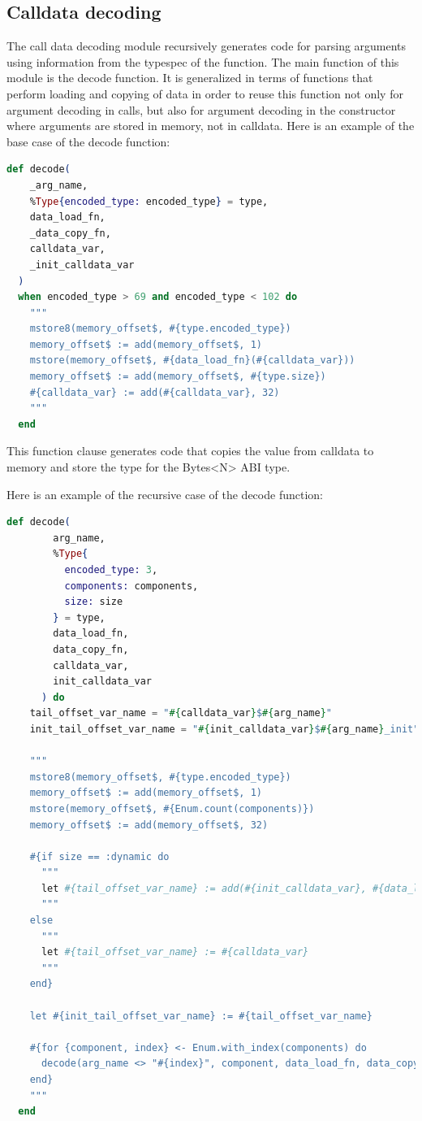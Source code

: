 \subsection{Calldata decoding}
\label{ssec:calldata_decoding}
The call data decoding module recursively generates code for parsing arguments using information from the typespec of the function. The main function of this module is the decode function. It is generalized in terms of functions that perform loading and copying of data in order to reuse this function not only for argument decoding in calls, but also for argument decoding in the constructor where arguments are stored in memory, not in calldata. Here is an example of the base case of the decode function:

\begin{lstlisting}[caption={Calldata decoding base case}, language=elixir, label={lst:calldata_decoding_base}]
  def decode(
    _arg_name,
    %Type{encoded_type: encoded_type} = type,
    data_load_fn,
    _data_copy_fn,
    calldata_var,
    _init_calldata_var
  )
  when encoded_type > 69 and encoded_type < 102 do
    """
    mstore8(memory_offset$, #{type.encoded_type})
    memory_offset$ := add(memory_offset$, 1)
    mstore(memory_offset$, #{data_load_fn}(#{calldata_var}))
    memory_offset$ := add(memory_offset$, #{type.size})
    #{calldata_var} := add(#{calldata_var}, 32)
    """
  end
\end{lstlisting}

This function clause generates code that copies the value from calldata to memory and store the type for the Bytes<N> ABI type.

Here is an example of the recursive case of the decode function:

\begin{lstlisting}[caption={Calldata decoding recursive case}, language=elixir, label={lst:calldata_decoding_recursive}]
  def decode(
        arg_name,
        %Type{
          encoded_type: 3,
          components: components,
          size: size
        } = type,
        data_load_fn,
        data_copy_fn,
        calldata_var,
        init_calldata_var
      ) do
    tail_offset_var_name = "#{calldata_var}$#{arg_name}"
    init_tail_offset_var_name = "#{init_calldata_var}$#{arg_name}_init"

    """
    mstore8(memory_offset$, #{type.encoded_type})
    memory_offset$ := add(memory_offset$, 1)
    mstore(memory_offset$, #{Enum.count(components)})
    memory_offset$ := add(memory_offset$, 32)

    #{if size == :dynamic do
      """
      let #{tail_offset_var_name} := add(#{init_calldata_var}, #{data_load_fn}(#{calldata_var}))
      """
    else
      """
      let #{tail_offset_var_name} := #{calldata_var}
      """
    end}

    let #{init_tail_offset_var_name} := #{tail_offset_var_name}

    #{for {component, index} <- Enum.with_index(components) do
      decode(arg_name <> "#{index}", component, data_load_fn, data_copy_fn, tail_offset_var_name, init_tail_offset_var_name)
    end}
    """
  end
\end{lstlisting}

